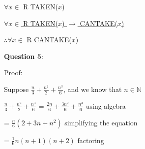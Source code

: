 \documentclass{article} %
\newcommand{\question}[2][]{\begin{flushleft}
        \textbf{Question #1}: \textit{#2}

\end{flushleft}}
\begin{document}
    $\forall x \in $ R TAKEN($x$)

    \underline{$\forall x \in$ R TAKEN($x$) $\rightarrow$ CANTAKE($x$)}

    $\therefore \forall x \in$ R CANTAKE($x$)











    \newpage


    \question[5]{}


    Proof:

    Suppose $\frac{n}{3} + \frac{n^2}{2} + \frac{n^3}{6}$, and we know that $n \in \mathbb{N}$

    $\frac{n}{3} + \frac{n^2}{2} + \frac{n^3}{6}$ = $\frac{2n}{6} + \frac{3n^2}{6} + \frac{n^3}{6}$ \tabto*{6cm}using algebra
    
    \vspace*{0.08cm}

    \tabto*{2.57cm} = $\frac{n}{6}(2 + 3n + n^2)$ \tabto*{6cm}simplifying the equation

    \vspace*{0.08cm}

    \tabto*{2.57cm} = $\frac{1}{6}n(n + 1)(n + 2)$ \tabto*{6cm}factoring
    
\end{document}
